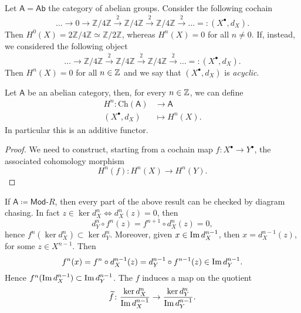 \begin{ex}
	Let $\mathsf{A} = \mathsf{Ab}$ the category of abelian groups.
	Consider the following cochain
	\begin{equation}
	\ldots \to 0 \to \mathbb{Z}/4\mathbb{Z} \xrightarrow{\dot{2}} \mathbb{Z}/4\mathbb{Z}
	\xrightarrow{\dot{2}} \mathbb{Z}/4\mathbb{Z} \xrightarrow{\dot{2}} \ldots
	=: \left( X^{\bullet}, d_{X} \right)	
	.\end{equation} 
	Then $H^0(X) = 2\mathbb{Z}/4\mathbb{Z} \simeq \mathbb{Z}/2\mathbb{Z}$, whereas
	$H^n(X) = 0$ for all $n \neq 0$.
	If, instead, we considered the following object
	\begin{equation}
	\ldots \to \mathbb{Z}/4\mathbb{Z} \xrightarrow{\dot{2}} \mathbb{Z}/4\mathbb{Z}
	\xrightarrow{\dot{2}} \mathbb{Z}/4\mathbb{Z} \xrightarrow{\dot{2}} \ldots
	=: \left( X^{\bullet}, d_{X} \right)	
	.\end{equation} 
	Then $H^n(X) = 0$ for all $n \in \mathbb{Z}$ and we say that 
	$\left( X^{\bullet}, d_{X} \right)$ is {\em acyclic}.
\end{ex}

\begin{prop}
	Let $\mathsf{A}$ be an abelian category, then, for every $n \in \mathbb{Z}$, we can define 
	\begin{align}
		H^n\colon \mathrm{Ch}(\mathsf{A}) &\to \mathsf{A} \\
		\left( X^{\bullet}, d_{X} \right) &\mapsto H^n(X)
	.\end{align}
	In particular this is an additive functor.
\end{prop} 
\begin{proof}
	We need to construct, starting from a cochain map $f\colon X^{\bullet} \to Y^{\bullet}$, the associated cohomology morphism
	\begin{equation}
		H^n(f)\colon H^n(X) \to H^n(Y)
	.\end{equation} 
\end{proof}

\begin{rem}[]
	If $\mathsf{A} \coloneqq \mathsf{Mod}\text{-}R$, then every part of the above result can be
	checked by diagram chasing.
	In fact $z \in \ker d^n_X \iff d^n_X(z) = 0$, then
	\begin{equation}
		d^n_Y \circ f^n(z) = f^{n+1} \circ d^n_X(z) = 0
	,\end{equation} 
	hence $f^n(\ker d^n_X) \subset \ker d^n_Y$.
	Moreover, given $x \in \operatorname{Im} d^{n-1}_X$, then $x = d^{n-1}_X(z)$, for some $z \in X^{n-1}$.
	Then
	\begin{equation}
		f^n(x) = f^n \circ d^{n-1}_X(z) =
		d^{n-1}_Y \circ f^{n-1} (z) \in \operatorname{Im} d^{n-1}_Y
	.\end{equation} 
	Hence $f^n(\operatorname{Im} d^{n-1}_X) \subset \operatorname{Im} d^{n-1}_Y$.
	The $f$ induces a map on the quotient
	\begin{equation}
	\widetilde{f}\colon \frac{\ker d^n_X}{\operatorname{Im} d_X^{n-1}} \to \frac{\ker d^n_Y}{\operatorname{Im} d_Y^{n-1}}
	.\end{equation} 
\end{rem}

